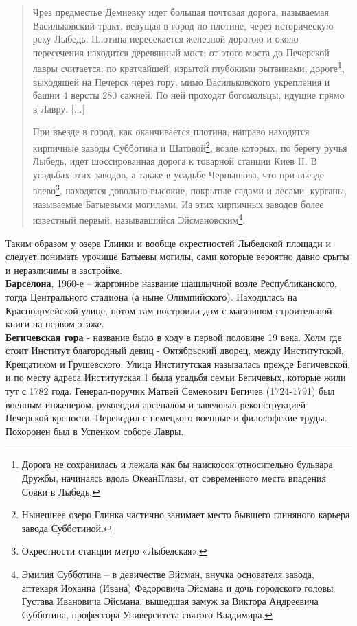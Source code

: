 \begin{quotation}
Чрез предместье Демиевку идет большая почтовая дорога, называемая Васильковский тракт, ведущая в город по плотине, через историческую реку Лыбедь. Плотина пересекается железной дорогою и около пересечения находится деревянный мост; от этого моста до Печерской лавры считается: по кратчайшей, изрытой глубокими рытвинами, дороге\footnote{Дорога не сохранилась и лежала как бы наискосок относительно бульвара Дружбы, начинаясь вдоль ОкеанПлазы, от современного места впадения Совки в Лыбедь.}, выходящей на Печерск через гору, мимо Васильковского укрепления и башни 4 версты 280 сажней. По ней проходят богомольцы, идущие прямо в Лавру. [...]

При въезде в город, как оканчивается плотина, направо находятся кирпичные заводы Субботина и Шатовой\footnote{Нынешнее озеро Глинка частично занимает место бывшего глиняного карьера завода Субботиной.}, возле которых, по берегу ручья Лыбедь, идет шоссированная дорога к товарной станции Киев II. В усадьбах этих заводов, а также в усадьбе Чернышова, что при въезде влево\footnote{Окрестности станции метро «Лыбедская».}, находятся довольно высокие, покрытые садами и лесами, курганы, называемые Батыевыми могилами. Из этих кирпичных заводов более известный первый, называвшийся Эйсмановским\footnote{Эмилия Субботина – в девичестве Эйсман, внучка основателя завода, аптекаря Иоханна (Ивана) Федоровича Эйсмана и дочь городского головы Густава Ивановича Эйсмана, вышедшая замуж за Виктора Андреевича Субботина, профессора Университета святого Владимира.}. 
\end{quotation}

Таким образом у озера Глинки и вообще окрестностей Лыбедской площади и следует понимать урочище Батыевы могилы, сами которые вероятно давно срыты и неразличимы в застройке.\\


\textbf{Барселона}, 1960-е – жаргонное название шашлычной возле Республиканского, тогда Центрального стадиона (а ныне Олимпийского). Находилась на Красноармейской улице, потом там построили дом с магазином строительной книги на первом этаже.\\

\textbf{Бегичевская гора} - название было в ходу в первой половине 19 века. Холм где стоит Институт благородный девиц - Октябрьский дворец, между Институтской, Крещатиком и Грушевского. Улица Институтская называлась прежде Бегичевской, и по месту адреса Институтская 1 была усадьбя семьи Бегичевых, которые жили тут с 1782 года. Генерал-поручик Матвей Семенович Бегичев (1724-1791) был военным инженером, руководил арсеналом и заведовал реконструкцией Печерской крепости. Переводил с немецкого военные и философские труды. Похоронен был в Успенком соборе Лавры.

